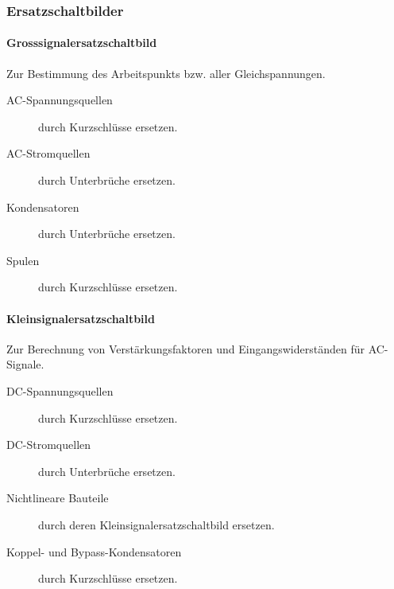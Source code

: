 \subsubsection{Ersatzschaltbilder}
\paragraph{Grosssignalersatzschaltbild}
Zur Bestimmung des Arbeitspunkts bzw. aller Gleichspannungen.
\begin{description}
    \item[AC-Spannungsquellen] durch Kurzschlüsse ersetzen.
    \item[AC-Stromquellen] durch Unterbrüche ersetzen. 
    \item[Kondensatoren] durch Unterbrüche ersetzen.
    \item[Spulen] durch Kurzschlüsse ersetzen.  
\end{description}

\paragraph{Kleinsignalersatzschaltbild}
Zur Berechnung von Verstärkungsfaktoren und Eingangswiderständen für AC-Signale.
\begin{description}
    \item[DC-Spannungsquellen] durch Kurzschlüsse ersetzen.
    \item[DC-Stromquellen] durch Unterbrüche ersetzen. 
    \item[Nichtlineare Bauteile] durch deren Kleinsignalersatzschaltbild ersetzen.
    \item[Koppel- und Bypass-Kondensatoren] durch Kurzschlüsse ersetzen.  
\end{description}